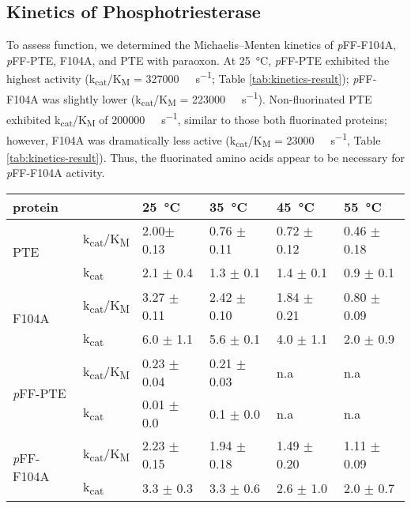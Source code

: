 \begin{refsection}
\subsection{Kinetics of Phosphotriesterase}

To assess function, we determined the Michaelis–Menten kinetics of
\emph{p}FF-F104A, \emph{p}FF-PTE, F104A, and PTE with paraoxon. At
\SI{25}{\celsius}, \emph{p}FF-PTE exhibited the highest activity
(k\textsubscript{cat}/K\textsubscript{M} = \SI{327000}{\per\Molar\per\second};
Table \ref{tab:kinetics-result}); \emph{p}FF-F104A was slightly lower
(k\textsubscript{cat}/K\textsubscript{M} = \SI{223000}{\per\Molar\per\second}).
Non-fluorinated PTE exhibited k\textsubscript{cat}/K\textsubscript{M} of
\SI{200000}{\per\Molar\per\second}, similar to those both fluorinated proteins;
however, F104A was dramatically less active
(k\textsubscript{cat}/K\textsubscript{M} = \SI{23000}{\per\Molar\per\second},
Table \ref{tab:kinetics-result}).  Thus, the fluorinated amino acids appear to
be necessary for \emph{p}FF-F104A activity. 
\begin{table}[h!]
\centering
    \begin{tabular}{llllll}
    \hline
    protein                 &  & \SI{25}{\celsius} & \SI{35}{\celsius} &
    \SI{45}{\celsius} & \SI{55}{\celsius} \\ 
    \hline
    \multirow{2}{*}{PTE}    & k\textsubscript{cat}/K\textsubscript{M} & 2.00$
    \pm$ 0.13 & 0.76 $\pm$ 0.11 & 0.72 $\pm$ 0.12 & 0.46 $\pm$ 0.18 \\
    
    & k\textsubscript{cat} & 2.1 $\pm$ 0.4 & 1.3 $\pm$ 0.1 & 1.4 $\pm$ 0.1 & 0.9
    $\pm$ 0.1 \\
    \multirow{2}{*}{F104A}  & k\textsubscript{cat}/K\textsubscript{M} & 3.27
    $\pm$ 0.11 & 2.42 $\pm$ 0.10 & 1.84 $\pm$ 0.21 & 0.80 $\pm$ 0.09 \\ 
    
    & k\textsubscript{cat} & 6.0 $\pm$ 1.1 & 5.6 $\pm$ 0.1 & 4.0 $\pm$ 1.1 &
    2.0 $\pm$ 0.9 \\
    \multirow{2}{*}{\emph{p}FF-PTE} & k\textsubscript{cat}/K\textsubscript{M} &
    0.23 $\pm$ 0.04 & 0.21 $\pm$ 0.03 & n.a & n.a \\ 
    
    & k\textsubscript{cat} & 0.01 $\pm$ 0.0 & 0.1 $\pm$ 0.0 & n.a & n.a \\
    \multirow{2}{*}{\emph{p}FF-F104A} & k\textsubscript{cat}/K\textsubscript{M}
    & 2.23 $\pm$ 0.15 & 1.94 $\pm$ 0.18 & 1.49 $\pm$ 0.20 & 1.11 $\pm$ 0.09 \\
    & k\textsubscript{cat} & 3.3 $\pm$ 0.3 & 3.3 $\pm$ 0.6 & 2.6 $\pm$ 1.0 &
    2.0 $\pm$ 0.7 \\ 
    

\end{tabular}
\end{table}
\end{refsection}
